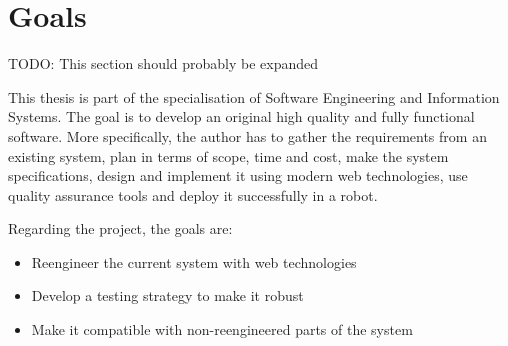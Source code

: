 




\section{Goals}
TODO: This section should probably be expanded

This thesis is part of the specialisation of Software Engineering and Information Systems. 
The goal is to develop an original high quality and fully functional software. 
More specifically, the author has to gather the requirements from an existing system, plan in terms of scope, time and cost, make the system specifications, design and implement it using modern web technologies, use quality assurance tools and deploy it successfully in a  robot.

Regarding the project, the goals are:
\begin{itemize}
	\item Reengineer the current system with web technologies
	\item Develop a testing strategy to make it robust
	\item Make it compatible with non-reengineered parts of the system
\end{itemize}


